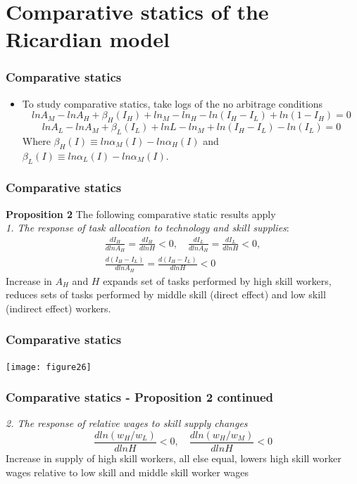 \documentclass[mathserif]{beamer}
\begin{document}
\section{Comparative statics of the Ricardian model}
\begin{frame}
\frametitle{Comparative statics}
\begin{itemize}
\item To study comparative statics, take logs of the no arbitrage conditions
\begin{equation*}
lnA_M-lnA_H+\beta_H(I_H)+ln_M-ln_H-ln(I_H-I_L)+ln(1-I_H)=0
\end{equation*}
\begin{equation*}
lnA_L-lnA_M+\beta_L(I_L)+lnL-ln_M+ln(I_H-I_L)-ln(I_L)=0
\end{equation*}
Where $\beta_H(I)\equiv ln\alpha_M(I)-ln\alpha_H(I)$ and $\beta_L(I)\equiv ln\alpha_L(I)-ln\alpha_M(I)$.
\end{itemize}
\end{frame}
\begin{frame}
\frametitle{Comparative statics}
\textbf{Proposition 2} The following comparative static results apply \\
\textit{1. The response of task allocation to technology and skill supplies}:
\begin{multline*}
\frac{dI_H}{dlnA_H}=\frac{dI_H}{dlnH}<0, \quad \frac{dI_L}{dlnA_H}=\frac{dI_L}{dlnH}<0, \\ \frac{d(I_H-I_L)}{dlnA_H}=\frac{d(I_H-I_L)}{dlnH}<0
\end{multline*}
Increase in $A_H$ and $H$ expands set of tasks performed by high skill workers, reduces sets of tasks performed by middle skill (direct effect) and low skill (indirect effect) workers.
\end{frame}
\begin{frame}
\frametitle{Comparative statics}
\texttt{[image: figure26]}
\end{frame}
\begin{frame}
\frametitle{Comparative statics - \textbf{Proposition 2} continued}
\textit{2. The response of relative wages to skill supply changes}
\begin{equation*}
\frac{dln(w_H/w_L)}{dlnH}<0, \quad \frac{dln(w_H/w_M)}{dlnH}<0
\end{equation*}
Increase in supply of high skill workers, all else equal, lowers high skill worker wages relative to low skill and middle skill worker wages
\end{frame}
\end{document}
